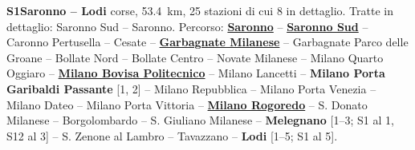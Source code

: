 \medskip\noindent\hypertarget{lin:S1}{\textbf{S1\enspace Saronno -- Lodi}} corse, \SI{53,4}{\km}, 25 stazioni di cui 8 in dettaglio. Tratte in dettaglio: Saronno Sud -- Saronno. Percorso: \hyperlink{sta:S01933}{\textbf{Saronno}} -- \hyperlink{sta:S01077}{\textbf{Saronno Sud}} -- Caronno Pertusella -- Cesate -- \hyperlink{sta:S01074}{\textbf{Garbagnate Milanese}} -- Garbagnate Parco delle Groane -- Bollate Nord -- Bollate Centro -- Novate Milanese -- Milano Quarto Oggiaro -- \hyperlink{sta:S01642}{\textbf{Milano Bovisa Politecnico}} -- Milano Lancetti -- \hypertarget{sta:S01647}{\textbf{Milano Porta Garibaldi Passante}} [1, 2] -- Milano Repubblica -- Milano Porta Venezia -- Milano Dateo -- Milano Porta Vittoria -- \hyperlink{sta:S01820}{\textbf{Milano Rogoredo}} -- S. Donato Milanese -- Borgolombardo -- S. Giuliano Milanese -- \hypertarget{sta:S01822}{\textbf{Melegnano}} [1--3; S1 al 1, S12 al 3] -- S. Zenone al Lambro -- Tavazzano -- \hypertarget{sta:S01825}{\textbf{Lodi}} [1--5; S1 al 5].
